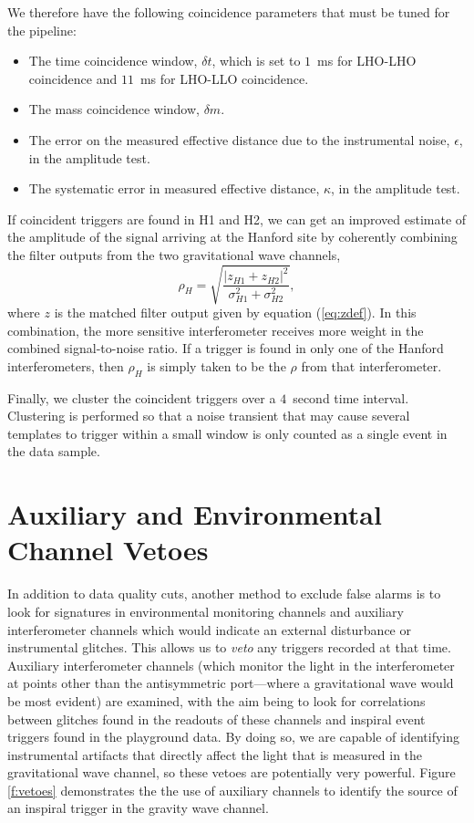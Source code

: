 We therefore have the following coincidence parameters that must be tuned for
the pipeline:
\begin{itemize}
\item The time coincidence window, $\delta t$, which is set to $1$~ms for
LHO-LHO coincidence and $11$~ms for LHO-LLO coincidence.

\item The mass coincidence window, $\delta m$.

\item The error on the measured effective distance due to the instrumental
noise, $\epsilon$, in the amplitude test.

\item The systematic error in measured effective distance, $\kappa$, in the
amplitude test.
\end{itemize}

If coincident triggers are found in H1 and H2, we can get an improved estimate
of the amplitude of the signal arriving at the Hanford site by coherently
combining the filter outputs from the two gravitational wave channels, 
\begin{equation}
\rho_H = \sqrt{ \frac{|z_{H1} + z_{H2}|^2}{\sigma_{H1}^2 +
     \sigma_{H2}^2} },
\label{eq:rhoH}
\end{equation}
where $z$ is the matched filter output given by equation (\ref{eq:zdef}).
In this combination, the more sensitive interferometer receives more weight in
the combined signal-to-noise ratio.  If a trigger is found in only one of the
Hanford interferometers, then $\rho_H$ is simply taken to be the $\rho$ from
that interferometer.

Finally, we cluster the coincident triggers over a $4$~second time interval.
Clustering is performed so that a noise transient that may cause several
templates to trigger within a small window is only counted as a single event
in the data sample.

\section{Auxiliary and Environmental Channel Vetoes}
\label{s:vetoes}

In addition to data quality cuts, another method to exclude false alarms is to
look for signatures in environmental monitoring channels and auxiliary
interferometer channels which would indicate an external disturbance or
instrumental glitches. This allows us to {\it veto} any triggers recorded at
that time.  Auxiliary interferometer channels (which monitor the light in the
interferometer at points other than the antisymmetric port---where a
gravitational wave would be most evident) are examined, with the aim being to
look for correlations between glitches found in the readouts of these channels
and inspiral event triggers found in the playground data.  By doing so, we are
capable of identifying instrumental artifacts that directly affect the light
that is measured in the gravitational wave channel, so these vetoes are
potentially very powerful. Figure \ref{f:vetoes} demonstrates the the use of
auxiliary channels to identify the source of an inspiral trigger in the
gravity wave channel.


